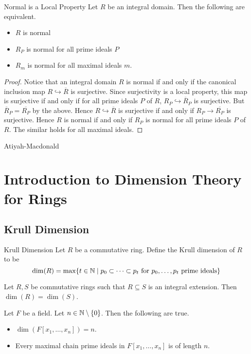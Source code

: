 \documentclass[a4paper]{article}
\begin{document}
\begin{prp}{Normal is a Local Property}{} Let $R$ be an integral domain. Then the following are equivalent. 
\begin{itemize}
\item $R$ is normal
\item $R_P$ is normal for all prime ideals $P$
\item $R_m$ is normal for all maximal ideals $m$. 
\end{itemize} \tcbline
\begin{proof}
Notice that an integral domain $R$ is normal if and only if the canonical inclusion map $R\hookrightarrow\overline{R}$ is surjective. Since surjectivity is a local property, this map is surjective if and only if for all prime ideals $P$ of $R$, $R_P\hookrightarrow\overline{R}_P$ is surjective. But $\overline{R}_P=\overline{R_P}$ by the above. Hence $R\hookrightarrow\overline{R}$ is surjective if and only if $R_P\to\overline{R_P}$ is surjective. Hence $R$ is normal if and only if $R_P$ is normal for all prime ideals $P$ of $R$. The similar holds for all maximal ideals. 
\end{proof}
\end{prp}

Atiyah-Macdonald

\pagebreak
\section{Introduction to Dimension Theory for Rings}
\subsection{Krull Dimension}
\begin{defn}{Krull Dimension}{} Let $R$ be a commutative ring. Define the Krull dimension of $R$ to be $$\dim(R)=\max\{t\in\mathbb{N}\;|\;p_0\subset\dots\subset p_t\text{ for }p_0,\dots,p_t\text{ prime ideals}\}$$
\end{defn}

\begin{lmm}{}{} Let $R,S$ be commutative rings such that $R\subseteq S$ is an integral extension. Then $\dim(R)=\dim(S)$. 
\end{lmm}

\begin{prp}{}{} Let $F$ be a field. Let $n\in\mathbb{N}\setminus\{0\}$. Then the following are true. 
\begin{itemize}
\item $\dim(F[x_1,\dots,x_n])=n$. 
\item Every maximal chain prime ideals in $F[x_1,\dots,x_n]$ is of length $n$. 
\end{itemize}
\end{prp}
\end{document}
